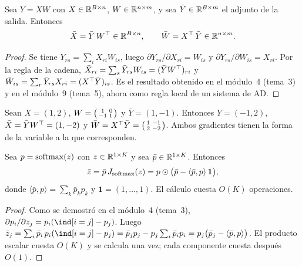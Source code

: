 \begin{proposicion}\label{prop:vjp-lineal}
Sea $Y=XW$ con $X\in\mathbb{R}^{B\times n}$, $W\in\mathbb{R}^{n\times m}$, y sea $\bar Y\in\mathbb{R}^{B\times m}$ el adjunto de la salida. Entonces
\[
\bar X=\bar Y\,W^{\top}\in\mathbb{R}^{B\times n},\qquad \bar W=X^{\top}\,\bar Y\in\mathbb{R}^{n\times m}.
\]
\end{proposicion}

\begin{proof}
Se tiene $Y_{rs}=\sum_iX_{ri}W_{is}$, luego $\partial Y_{rs}/\partial X_{ri}=W_{is}$ y $\partial Y_{rs}/\partial W_{is}=X_{ri}$. Por la regla de la cadena, $\bar X_{ri}=\sum_s\bar Y_{rs}W_{is}=(\bar YW^{\top})_{ri}$ y $\bar W_{is}=\sum_r\bar Y_{rs}X_{ri}=(X^{\top}\bar Y)_{is}$. Es el resultado obtenido en el módulo~4 (tema~3) y en el módulo~9 (tema~5), ahora como regla local de un sistema de AD.
\end{proof}

\begin{ejemplo}\label{ej:vjp-lineal}
Sean $X=(1,2)$, $W=\begin{psmallmatrix}1&0\\-1&1\end{psmallmatrix}$ y $\bar Y=(1,-1)$. Entonces $Y=(-1,2)$, $\bar X=\bar YW^{\top}=(1,-2)$ y $\bar W=X^{\top}\bar Y=\begin{psmallmatrix}1&-1\\2&-2\end{psmallmatrix}$. Ambos gradientes tienen la forma de la variable a la que corresponden.
\end{ejemplo}

\begin{proposicion}\label{prop:vjp-softmax}
Sea $p=\operatorname{softmax}(z)$ con $z\in\mathbb{R}^{1\times K}$ y sea $\bar p\in\mathbb{R}^{1\times K}$. Entonces
\[
\bar z=\bar p\,J_{\operatorname{softmax}}(z)=p\odot\bigl(\bar p-\langle\bar p,p\rangle\,\mathbf{1}\bigr),
\]
donde $\langle\bar p,p\rangle=\sum_k\bar p_kp_k$ y $\mathbf 1=(1,\dots,1)$. El cálculo cuesta $O(K)$ operaciones.
\end{proposicion}

\begin{proof}
Como se demostró en el módulo~4 (tema~3), $\partial p_i/\partial z_j=p_i(\ind[i=j]-p_j)$. Luego $\bar z_j=\sum_i\bar p_i\,p_i(\ind[i=j]-p_j)=\bar p_jp_j-p_j\sum_i\bar p_ip_i=p_j\bigl(\bar p_j-\langle\bar p,p\rangle\bigr)$. El producto escalar cuesta $O(K)$ y se calcula una vez; cada componente cuesta después $O(1)$.
\end{proof}

